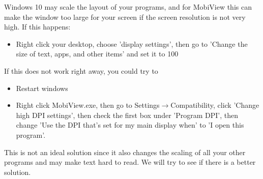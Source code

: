 \documentclass[11pt]{article}
\theoremstyle{definition}
\begin{document}
Windows 10 may scale the layout of your programs, and for MobiView this can make the window too large for your screen if the screen resolution is not very high. If this happens:
\begin{itemize}
\item Right click your desktop, choose 'display settings', then go to 'Change the size of text, apps, and other items' and set it to 100%
\end{itemize}
If this does not work right away, you could try to
\begin{itemize}
\item Restart windows
\item Right click MobiView.exe, then go to Settings$\rightarrow$Compatibility, click 'Change high DPI settings', then check the first box under 'Program DPI', then change 'Use the DPI that's set for my main display when' to 'I open this program'.
\end{itemize}
This is not an ideal solution since it also changes the scaling of all your other programs and may make text hard to read. We will try to see if there is a better solution.



\end{document}
